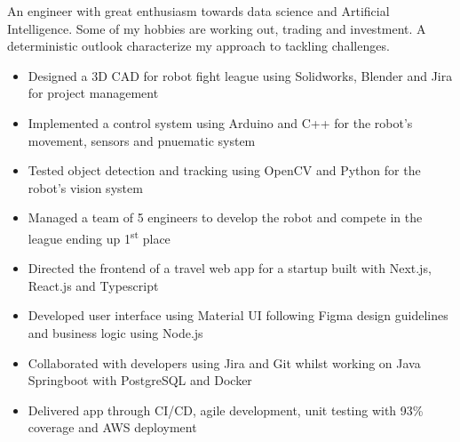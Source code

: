 \documentclass[11pt,a4paper,ragged2e]{altacv}
\begin{document}
\begin{paracol}{1}
\smallskip
{}

An engineer with great enthusiasm towards data science and Artificial Intelligence. Some of my hobbies are working out, trading and investment. A deterministic outlook characterize my approach to tackling challenges.\smallskip



\begin{itemize}
\item Designed a 3D CAD for robot fight league using Solidworks, Blender and Jira for project management
\item Implemented a control system using Arduino and C++ for the robot's movement, sensors and pnuematic system
\item Tested object detection and tracking using OpenCV and Python for the robot's vision system
\item Managed a team of 5 engineers to develop the robot and compete in the league ending up 1\textsuperscript{st} place
\end{itemize}
\tightdivider

\begin{itemize}
\item Directed the frontend of a travel web app for a startup built with Next.js, React.js and Typescript
\item Developed user interface using Material UI following Figma design guidelines and business logic using Node.js
\item Collaborated with developers using Jira and Git whilst working on Java Springboot with PostgreSQL and Docker
\item Delivered app through CI/CD, agile development, unit testing with 93\% coverage and AWS deployment
\end{itemize}
\tightdivider


\end{paracol}
\end{document}
